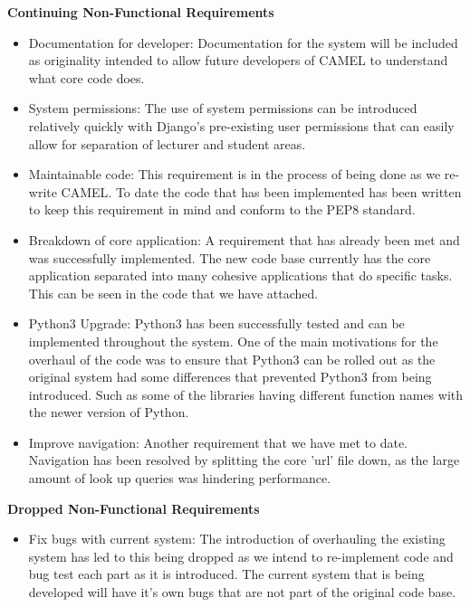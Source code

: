	\textbf{Continuing Non-Functional Requirements}
	\begin{itemize}
		
		\item Documentation for developer: Documentation for the system will be included as originality intended to allow future developers of CAMEL to understand what core code does.  
		
		\item System permissions: The use of system permissions can be introduced relatively quickly with Django's pre-existing user permissions that can easily allow for separation of lecturer and student areas.    
		
		\item Maintainable code: This requirement is in the process of being done as we re-write CAMEL. To date the code that has been implemented has been written to keep this requirement in mind and conform to the PEP8 standard.
		
		\item Breakdown of core application: A requirement that has already been met and was successfully implemented. The new code base currently has the core application separated into many cohesive applications that do specific tasks. This can be seen in the code that we have attached.
		
		\item Python3 Upgrade: Python3 has been successfully tested and can be implemented throughout the system. One of the main motivations for the overhaul of the code was to ensure that Python3 can be rolled out as the original system had some differences that prevented Python3 from being introduced. Such as some of the libraries having different function names with the newer version of Python.    
		
		\item Improve navigation: Another requirement that we have met to date. Navigation has been resolved by splitting the core 'url' file down, as the large amount of look up queries was hindering performance.
	\end{itemize}
	
	\textbf{Dropped Non-Functional Requirements}
	\begin{itemize}
		\item Fix bugs with current system: The introduction of overhauling the existing system has led to this being dropped as we intend to re-implement code and bug test each part as it is introduced. The current system that is being developed will have it's own bugs that are not part of the original code base.   
	\end{itemize}
	